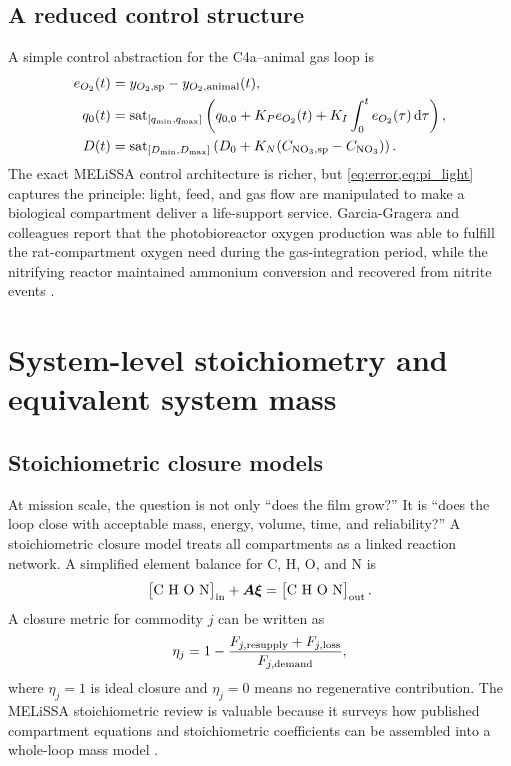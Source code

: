 \documentclass[11pt]{article}
\newcommand{\MEL}{MELiSSA}
\newcommand{\dd}{\mathrm{d}}
\begin{document}
\subsection{A reduced control structure}

A simple control abstraction for the C4a--animal gas loop is
\begin{align}
  e_{O_2}(t)&=y_{O_2,\rm sp}-y_{O_2,\rm animal}(t),\label{eq:error}\\
  q_0(t)&=\operatorname{sat}_{[q_{\min},q_{\max}]}
  \left(q_{0,0}+K_Pe_{O_2}(t)+K_I\int_0^t e_{O_2}(\tau)\,\dd \tau\right),\label{eq:pi_light}\\
  D(t)&=\operatorname{sat}_{[D_{\min},D_{\max}]}
  \left(D_0+K_N(C_{\ce{NO3},\rm sp}-C_{\ce{NO3}})\right).
\end{align}
The exact \MEL{} control architecture is richer, but \cref{eq:error,eq:pi_light} captures the principle: light, feed, and gas flow are manipulated to make a biological compartment deliver a life-support service. Garcia-Gragera and colleagues report that the photobioreactor oxygen production was able to fulfill the rat-compartment oxygen need during the gas-integration period, while the nitrifying reactor maintained ammonium conversion and recovered from nitrite events \parencite[11, 13]{garcia2021}.

\section{System-level stoichiometry and equivalent system mass}

\subsection{Stoichiometric closure models}

At mission scale, the question is not only ``does the film grow?'' It is ``does the loop close with acceptable mass, energy, volume, time, and reliability?'' A stoichiometric closure model treats all compartments as a linked reaction network. A simplified element balance for C, H, O, and N is
\begin{equation}
\begin{bmatrix}
\text{C}\
\text{H}\
\text{O}\
\text{N}
\end{bmatrix}_{\rm in}
+\bm A\bm \xi
=\begin{bmatrix}
\text{C}\
\text{H}\
\text{O}\
\text{N}
\end{bmatrix}_{\rm out}.
\label{eq:elemental_matrix}
\end{equation}
A closure metric for commodity $j$ can be written as
\begin{equation}
  \eta_j=1-\frac{F_{j,\rm resupply}+F_{j,\rm loss}}{F_{j,\rm demand}},
  \label{eq:closure_eta}
\end{equation}
where $\eta_j=1$ is ideal closure and $\eta_j=0$ means no regenerative contribution. The \MEL{} stoichiometric review is valuable because it surveys how published compartment equations and stoichiometric coefficients can be assembled into a whole-loop mass model \parencite[Abstract, sec. 2--5]{vermeulen2023}.
\end{document}
